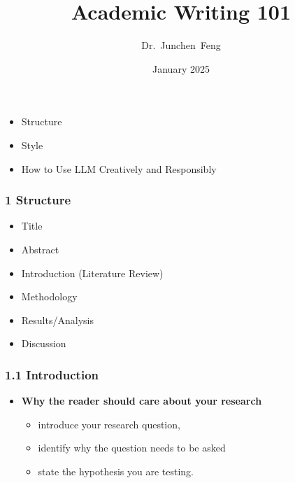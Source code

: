 \documentclass{beamer}
\title{Academic Writing 101}
\author{Dr.~Junchen~Feng}
\date{January 2025}
\begin{document}
\maketitle

\begin{frame}
    \begin{itemize}
        \item Structure
        \item Style
        \item How to Use LLM Creatively and Responsibly
    \end{itemize}
\end{frame}


\begin{frame}
\frametitle{1 Structure}
\begin{itemize}
    \item Title
    \item Abstract
    \item Introduction (Literature Review)
    \item Methodology
    \item Results/Analysis
    \item Discussion
\end{itemize}
\end{frame}
    

\begin{frame}
    \frametitle{1.1 Introduction}
    \begin{itemize}
        \item \textbf{Why the reader should care about your research}
        \begin{itemize}
            \item introduce your research question,
            \item identify why the question needs to be asked 
            \item state the hypothesis you are testing.
        \end{itemize}
    \end{itemize}
    \end{frame}
    
\end{document}
